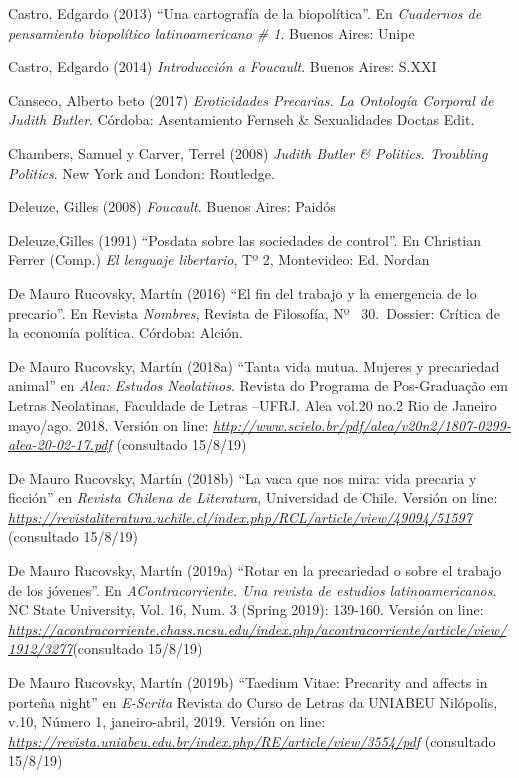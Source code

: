 \documentclass[a4paper,]{scrartcl}
\begin{document}
Castro, Edgardo (2013) ``Una cartografía de la biopolítica''. En
\emph{Cuadernos de pensamiento biopolítico latinoamericano \# 1}. Buenos
Aires: Unipe

Castro, Edgardo (2014) \emph{Introducción a Foucault}. Buenos Aires:
S.XXI

Canseco, Alberto beto (2017) \emph{Eroticidades Precarias. La Ontología
Corporal de Judith Butler}. Córdoba: Asentamiento Fernseh \&
Sexualidades Doctas Edit.

Chambers, Samuel y Carver, Terrel (2008) \emph{Judith Butler \&
Politics. Troubling Politics}. New York and London: Routledge.

Deleuze, Gilles (2008) \emph{Foucault}. Buenos Aires: Paidós

Deleuze,Gilles (1991) ``Posdata sobre las sociedades de control''. En
Christian Ferrer (Comp.) \emph{El lenguaje libertario}, Tº 2,
Montevideo: Ed. Nordan

De Mauro Rucovsky, Martín (2016) ``El fin del trabajo y la emergencia de
lo precario''. En Revista \emph{Nombres}, Revista de Filosofía, Nº~
30.~Dossier: Crítica de la economía política. Córdoba: Alción.

De Mauro Rucovsky, Martín (2018a) ``Tanta vida mutua. Mujeres y
precariedad animal'' en \emph{Alea: Estudos Neolatinos}. Revista do
Programa de Pos-Graduação em Letras Neolatinas, Faculdade de Letras
--UFRJ. Alea vol.20 no.2 Rio de Janeiro mayo/ago. 2018. Versión on line:
\href{http://www.scielo.br/pdf/alea/v20n2/1807-0299-alea-20-02-17.pdf}{\emph{http://www.scielo.br/pdf/alea/v20n2/1807-0299-alea-20-02-17.pdf}}
(consultado 15/8/19)

De Mauro Rucovsky, Martín (2018b) ``La vaca que nos mira: vida precaria
y ficción'' en \emph{Revista Chilena de Literatura}, Universidad de
Chile. Versión on line:
\href{https://revistaliteratura.uchile.cl/index.php/RCL/article/view/49094/51597}{\emph{https://revistaliteratura.uchile.cl/index.php/RCL/article/view/49094/51597}}
(consultado 15/8/19)

De Mauro Rucovsky, Martín (2019a) ``Rotar en la precariedad o sobre el
trabajo de los jóvenes''. En \emph{AContracorriente. Una revista de
estudios latinoamericanos}.~ NC State University, Vol. 16, Num. 3
(Spring 2019): 139-160. Versión on line:
\href{https://acontracorriente.chass.ncsu.edu/index.php/acontracorriente/article/view/1912/3277}{\emph{https://acontracorriente.chass.ncsu.edu/index.php/acontracorriente/article/view/1912/3277}}(consultado
15/8/19)

De Mauro Rucovsky, Martín (2019b) ``Taedium Vitae: Precarity and affects
in porteña night'' en \emph{E-Scrita} Revista do Curso de Letras da
UNIABEU Nilópolis, v.10, Número 1, janeiro-abril, 2019. Versión on line:
\href{https://revista.uniabeu.edu.br/index.php/RE/article/view/3554/pdf}{\emph{https://revista.uniabeu.edu.br/index.php/RE/article/view/3554/pdf}}
(consultado 15/8/19)
\end{document}
